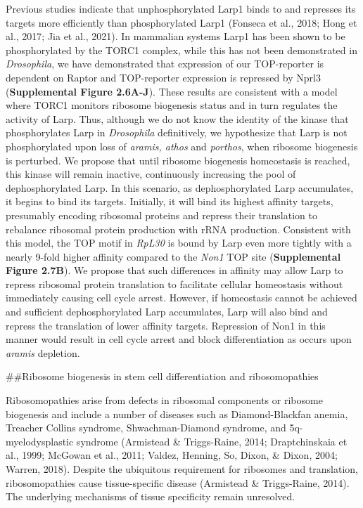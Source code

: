\documentclass[12pt,twoside]{reedthesis}
\begin{document}
Previous studies indicate that unphosphorylated Larp1 binds to and
represses its targets more efficiently than phosphorylated Larp1
(Fonseca et al., 2018; Hong et al., 2017; Jia et al., 2021). In mammalian systems Larp1 has been shown
to be phosphorylated by the TORC1 complex, while this has not been
demonstrated in \emph{Drosophila}, we have demonstrated that expression of
our TOP-reporter is dependent on Raptor and TOP-reporter expression is
repressed by Nprl3 (\textbf{Supplemental Figure 2.6A-J}). These results are consistent with
a model where TORC1 monitors ribosome biogenesis status and in turn
regulates the activity of Larp. Thus, although we do not know the
identity of the kinase that phosphorylates Larp in \emph{Drosophila}
definitively, we hypothesize that Larp is not phosphorylated upon loss
of \emph{aramis, athos} and \emph{porthos}, when ribosome biogenesis is perturbed.
We propose that until ribosome biogenesis homeostasis is reached, this
kinase will remain inactive, continuously increasing the pool of
dephosphorylated Larp. In this scenario, as dephosphorylated Larp
accumulates, it begins to bind its targets. Initially, it will bind its
highest affinity targets, presumably encoding ribosomal proteins and
repress their translation to rebalance ribosomal protein production with
rRNA production. Consistent with this model, the TOP motif in \emph{RpL30} is
bound by Larp even more tightly with a nearly 9-fold higher affinity
compared to the \emph{Non1} TOP site (\textbf{Supplemental Figure 2.7B}). We propose that such
differences in affinity may allow Larp to repress ribosomal protein
translation to facilitate cellular homeostasis without immediately
causing cell cycle arrest. However, if homeostasis cannot be achieved
and sufficient dephosphorylated Larp accumulates, Larp will also bind
and repress the translation of lower affinity targets. Repression of
Non1 in this manner would result in cell cycle arrest and block
differentiation as occurs upon \emph{aramis} depletion.

\#\#Ribosome biogenesis in stem cell differentiation and ribosomopathies

Ribosomopathies arise from defects in ribosomal components or ribosome
biogenesis and include a number of diseases such as Diamond-Blackfan
anemia, Treacher Collins syndrome, Shwachman-Diamond syndrome, and
5q-myelodysplastic syndrome (Armistead \& Triggs-Raine, 2014; Draptchinskaia et al., 1999; McGowan et al., 2011; Valdez, Henning, So, Dixon, \& Dixon, 2004; Warren, 2018).
Despite the ubiquitous requirement for ribosomes and translation,
ribosomopathies cause tissue-specific disease (Armistead \& Triggs-Raine, 2014). The
underlying mechanisms of tissue specificity remain unresolved.
\end{document}
